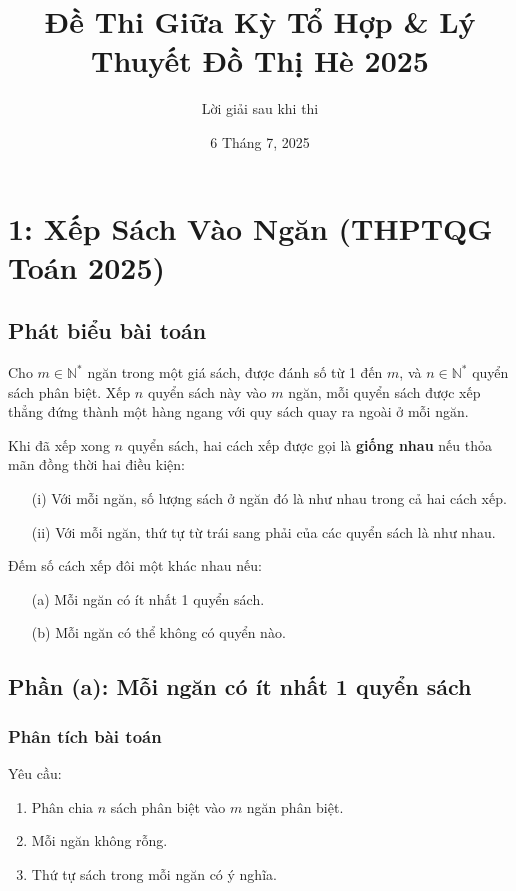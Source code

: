 \documentclass[a4paper,12pt]{article}
\title{Đề Thi Giữa Kỳ Tổ Hợp \& Lý Thuyết Đồ Thị Hè 2025}
\author{Lời giải sau khi thi}
\date{6 Tháng 7, 2025}
\theoremstyle{plain}
\theoremstyle{definition}
\begin{document}
\maketitle

\section*{1: Xếp Sách Vào Ngăn (THPTQG Toán 2025)}

\subsection*{Phát biểu bài toán}
Cho \( m \in \mathbb{N}^* \) ngăn trong một giá sách, được đánh số từ 1 đến \( m \), và \( n \in \mathbb{N}^* \) quyển sách phân biệt. Xếp \( n \) quyển sách này vào \( m \) ngăn, mỗi quyển sách được xếp thẳng đứng thành một hàng ngang với quy sách quay ra ngoài ở mỗi ngăn.

Khi đã xếp xong \( n \) quyển sách, hai cách xếp được gọi là \textbf{giống nhau} nếu thỏa mãn đồng thời hai điều kiện:
\begin{itemize}
    \item[(i)] Với mỗi ngăn, số lượng sách ở ngăn đó là như nhau trong cả hai cách xếp.
    \item[(ii)] Với mỗi ngăn, thứ tự từ trái sang phải của các quyển sách là như nhau.
\end{itemize}

Đếm số cách xếp đôi một khác nhau nếu:
\begin{itemize}
    \item[(a)] Mỗi ngăn có ít nhất 1 quyển sách.
    \item[(b)] Mỗi ngăn có thể không có quyển nào.
\end{itemize}

\subsection*{Phần (a): Mỗi ngăn có ít nhất 1 quyển sách}

\subsubsection*{Phân tích bài toán}
Yêu cầu:
\begin{enumerate}
    \item Phân chia \( n \) sách phân biệt vào \( m \) ngăn phân biệt.
    \item Mỗi ngăn không rỗng.
    \item Thứ tự sách trong mỗi ngăn có ý nghĩa.
\end{enumerate}
\end{document}
